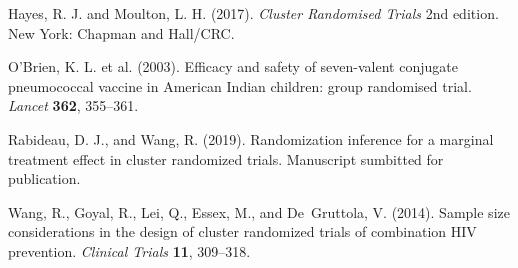 \documentclass[12pt]{article}\usepackage[]{graphicx}\usepackage[]{color}
\begin{document}
\noindent\hangindent=15pt Hayes, R. J. and Moulton, L. H. (2017). \textit{Cluster Randomised Trials} 2nd edition. New York: Chapman and Hall/CRC.

\noindent\hangindent=15pt O'Brien, K. L. et al. (2003). Efficacy and safety of seven-valent conjugate pneumococcal vaccine in American Indian children: group randomised trial. \textit{Lancet} \textbf{362}, 355--361.

\noindent\hangindent=15pt Rabideau, D. J., and Wang, R. (2019). Randomization inference for a marginal treatment effect in cluster randomized trials. Manuscript sumbitted for publication.

\noindent\hangindent=15pt Wang, R., Goyal, R., Lei, Q., Essex, M., and De~Gruttola, V. (2014). Sample size considerations in the design of cluster randomized trials of combination HIV prevention. \textit{Clinical Trials} \textbf{11}, 309–318.
\end{document}
